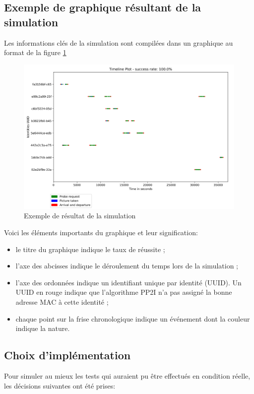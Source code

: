 \subsection{Exemple de graphique résultant de la simulation}
Les informations clés de la simulation sont compilées dans un graphique au format de la figure \ref{fig:simulation-result-example} 
\begin{figure}[H]
	\centering
	\includegraphics[width=12cm]{images/tests/exemple-graph.png}
	\caption{Exemple de résultat de la simulation}
	\label{fig:simulation-result-example}
\end{figure}

Voici les éléments importants du graphique et leur signification:
\begin{itemize}
    \item le titre du graphique indique le taux de réussite ;
    \item l'axe des abcisses indique le déroulement du temps lors de la simulation ;
    \item l'axe des ordonnées indique un identifiant unique par identité (UUID). Un UUID en rouge indique que l'algorithme PP2I n'a pas assigné la bonne adresse MAC à cette identité ; 
    \item chaque point sur la frise chronologique indique un événement dont la couleur indique la nature.
\end{itemize}

\subsection{Choix d'implémentation}
Pour simuler au mieux les tests qui auraient pu être effectués en condition réelle, les décisions suivantes ont été prises:


